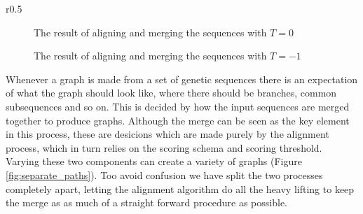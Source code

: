 \documentclass[thesis.tex]{subfiles}
\begin{document}
\begin{wrapfigure}{r}{0.5\textwidth}
\begin{mdframed}
\begin{subfigure}[t]{\textwidth}
\begin{mdframed}
\begin{center}
        \end{center}
      \end{mdframed}
      \caption{The result of aligning and merging the sequences with $T=0$}
    \end{subfigure}
    \begin{subfigure}[t]{\textwidth}
      \begin{mdframed}
        \begin{center}
        \end{center}
      \end{mdframed}
      \caption{The result of aligning and merging the sequences with $T=-1$}
    \end{subfigure}
  \end{mdframed}
  \caption{Different scoring thresholds $T$ yields different reference graphs}
  \label{fig:separate_paths}
\end{wrapfigure}
Whenever a graph is made from a set of genetic sequences there is an expectation of what the graph should look like, where there should be branches, common subsequences and so on. This is decided by how the input sequences are merged together to produce graphs. Although the merge can be seen as the key element in this process, these are desicions which are made purely by the alignment process, which in turn relies on the scoring schema and scoring threshold. Varying these two components can create a variety of graphs (Figure \ref{fig:separate_paths}). Too avoid confusion we have split the two processes completely apart, letting the alignment algorithm do all the heavy lifting to keep the merge as as much of a straight forward procedure as possible.\\
\end{document}
